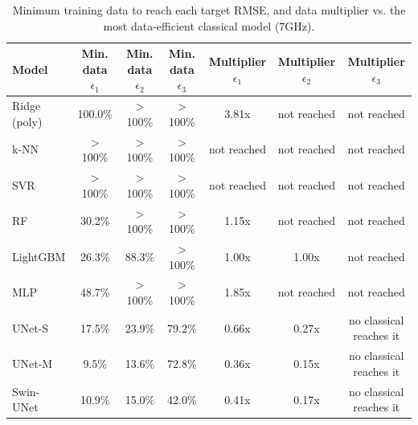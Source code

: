 \begin{table}[t]
\centering
\caption{Minimum training data to reach each target RMSE, and data multiplier vs. the most data-efficient classical model (7GHz).}
\begin{tabular}{lcccccc}
\hline
Model & Min. data $\epsilon_1$ & Min. data $\epsilon_2$ & Min. data $\epsilon_3$ & Multiplier $\epsilon_1$ & Multiplier $\epsilon_2$ & Multiplier $\epsilon_3$ \\
\hline
Ridge (poly) & 100.0\% & $>$100\% & $>$100\% & 3.81x & not reached & not reached \\
k-NN & $>$100\% & $>$100\% & $>$100\% & not reached & not reached & not reached \\
SVR & $>$100\% & $>$100\% & $>$100\% & not reached & not reached & not reached \\
RF & 30.2\% & $>$100\% & $>$100\% & 1.15x & not reached & not reached \\
LightGBM & 26.3\% & 88.3\% & $>$100\% & 1.00x & 1.00x & not reached \\
MLP & 48.7\% & $>$100\% & $>$100\% & 1.85x & not reached & not reached \\
UNet-S & 17.5\% & 23.9\% & 79.2\% & 0.66x & 0.27x & no classical reaches it \\
UNet-M & 9.5\% & 13.6\% & 72.8\% & 0.36x & 0.15x & no classical reaches it \\
Swin-UNet & 10.9\% & 15.0\% & 42.0\% & 0.41x & 0.17x & no classical reaches it \\
\hline
\end{tabular}
\end{table}